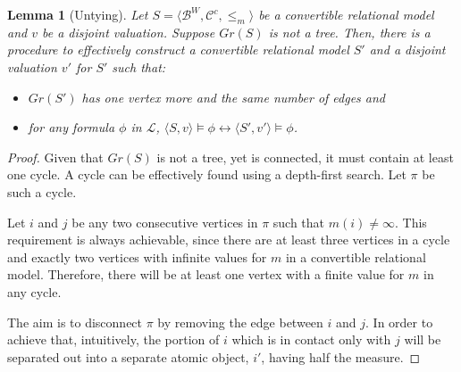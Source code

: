 \documentclass{article}
\newtheorem*{lemma}{Lemma}
\newcommand{\B}{\mathcal{B}}
\newcommand{\lang}{\mathcal{L}}
\begin{document}
\begin{lemma}[Untying]
  Let $S = \langle \B^W, \mathcal{C}^c, \leq_m \rangle$ be a convertible relational model and $v$ be a disjoint valuation. Suppose $Gr(S)$ is not a tree.
  Then, there is a procedure to effectively construct a convertible relational model $S'$ and a disjoint valuation $v'$ for $S'$ such that:
  \begin{itemize}
  \item $Gr(S')$ has one vertex more and the same number of edges and
  \item for any formula $\phi$ in $\lang$, $\langle S, v \rangle \models \phi \leftrightarrow \langle S', v' \rangle \models \phi$.
  \end{itemize}
\end{lemma}
\begin{proof}
  Given that $Gr(S)$ is not a tree, yet is connected, it must contain at least one cycle. A cycle can be effectively found using a depth-first search. Let $\pi$ be such a cycle.

  Let $i$ and $j$ be any two consecutive vertices in $\pi$ such that $m(i) \neq \infty$. This requirement is always achievable, since there are at least three vertices in a cycle and exactly two vertices with infinite values for $m$ in a convertible relational model. Therefore, there will be at least one vertex with a finite value for $m$ in any cycle.

  The aim is to disconnect $\pi$ by removing the edge between $i$ and $j$. In order to achieve that, intuitively, the portion of $i$ which is in contact only with $j$ will be separated out into a separate atomic object, $i'$, having half the measure.


\end{proof}
\end{document}
